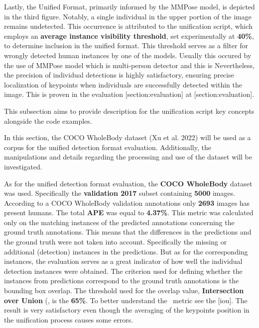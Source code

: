 Lastly, the Unified Format, primarily informed by the MMPose model, is depicted in the third figure. Notably, a single individual in the upper portion of the image remains undetected. This occurrence is attributed to the unification script, which employs an {\bf average instance visibility threshold}, set experimentally at {\bf 40\%}, to determine inclusion in the unified format. This threshold serves as a filter for wrongly detected human instances by one of the models. Usually this occured by the use of MMPose model which is multi-person detector and this is Nevertheless, the precision of individual detections is highly satisfactory, ensuring precise localization of keypoints when individuals are successfully detected within the image. This is proven in the evaluation [section:evaluation] at [section:evaluation].

This subsection aims to provide description for the unification script key concepts alongside the code examples.

In this section, the COCO WholeBody dataset (Xu et al. 2022) will be used as a corpus for the unified detection format evaluation. Additionally, the manipulations and details regarding the processing and use of the dataset will be investigated.

As for the unified detection format evaluation, the {\bf COCO WholeBody} dataset was used. Specifically the {\bf validation 2017} subset containing {\bf 5000} images. According to a COCO WholeBody validation annotations only {\bf 2693} images has present humans. The total {\bf APE} was equal to {\bf 4.37\%}. This metric was calculated only on the matching instances of the predicted annotations concerning the ground truth annotations. This means that the differences in the predictions and the ground truth were not taken into account. Specifically the missing or additional (detection) instances in the predictions. But as for the corresponding instances, the evaluation serves as a great indicator of how well the individual detection instances were obtained. The criterion used for defining whether the instances from predictions correspond to the ground truth annotations is the bounding box overlap. The threshold used for the overlap value, {\bf Intersection over Union} (\IoU\), is the {\bf 65\%}. To better understand the \IoU\ metric see the [iou]. The result is very satisfactory even though the averaging of the keypoints position in the unification process causes some errors.


